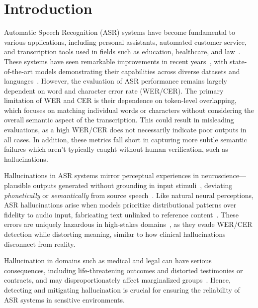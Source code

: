 \section{Introduction}\label{sec:introduction}

% 

Automatic Speech Recognition (ASR) systems have become fundamental to various applications, including personal assistants, automated customer service, and transcription tools used in fields such as education, healthcare, and law~\cite{zhang2023intelligent, adedeji2024sound}. These systems have seen remarkable improvements in recent years~\cite{arriaga2024evaluation,radford2022robustspeechrecognitionlargescale, communication2023seamlessm4tmassivelymultilingual}, with state-of-the-art models demonstrating their capabilities across diverse datasets and languages~\cite{shakhadri2025samba}. However, the evaluation of ASR performance remains largely dependent on word and character error rate (WER/CER). The primary limitation of WER and CER is their dependence on token-level overlapping, which focuses on matching individual words or characters without considering the overall semantic aspect of the transcription. This could result in misleading evaluations, as a high WER/CER does not necessarily indicate poor outputs in all cases.
In addition, these metrics fall short in capturing more subtle semantic failures which aren't typically caught without human verification, such as hallucinations. 



Hallucinations in ASR systems mirror perceptual experiences in neuroscience—plausible outputs generated without grounding in input stimuli~\cite{american2013diagnostic,zmigrod2016neural}, deviating \textit{phonetically} or \textit{semantically} from source speech~\cite{ji2023survey}. Like natural neural perceptions, ASR hallucinations arise when models prioritize distributional patterns over fidelity to audio input, fabricating text unlinked to reference content~\cite{hare2021hallucinations}. These errors are uniquely hazardous in high-stakes domains~\cite{williamson2024era}, as they evade WER/CER detection while distorting meaning, similar to how clinical hallucinations disconnect from reality.

Hallucination in domains such as medical and legal can have serious consequences, including life-threatening outcomes and distorted testimonies or contracts, and may disproportionately affect marginalized groups~\cite{faithful_ai_in_medicine, vishwanath2024faithfulness, mujtaba2024lost, sperber2020consistent, Koenecke_2024}. Hence, detecting and mitigating hallucination is crucial for ensuring the reliability of ASR systems in sensitive environments. 



